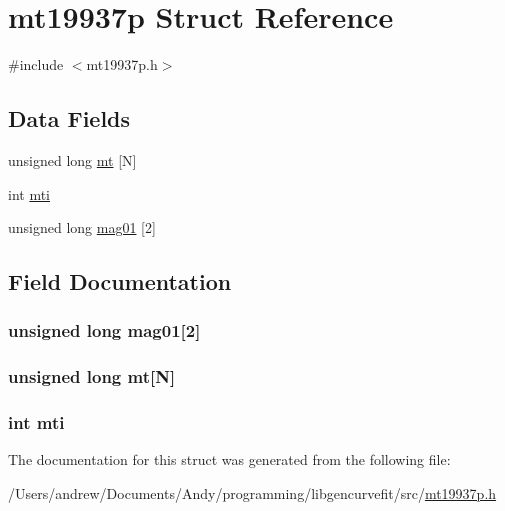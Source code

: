 \hypertarget{structmt19937p}{
\section{mt19937p Struct Reference}
\label{structmt19937p}
}


{\ttfamily \#include $<$mt19937p.h$>$}

\subsection*{Data Fields}
\begin{DoxyCompactItemize}
\item 
unsigned long \hyperlink{structmt19937p_aff3cefd0011b487c57a7af7cb3bc499f}{mt} \mbox{[}N\mbox{]}
\item 
int \hyperlink{structmt19937p_a0893639c022032e006e5b13378f7b4b2}{mti}
\item 
unsigned long \hyperlink{structmt19937p_ac9c466eceb95d637d5907eab06b468b4}{mag01} \mbox{[}2\mbox{]}
\end{DoxyCompactItemize}


\subsection{Field Documentation}
\hypertarget{structmt19937p_ac9c466eceb95d637d5907eab06b468b4}{
\subsubsection[{mag01}]{\setlength{\rightskip}{0pt plus 5cm}unsigned long {\bf mag01}\mbox{[}2\mbox{]}}}
\label{structmt19937p_ac9c466eceb95d637d5907eab06b468b4}
\hypertarget{structmt19937p_aff3cefd0011b487c57a7af7cb3bc499f}{
\subsubsection[{mt}]{\setlength{\rightskip}{0pt plus 5cm}unsigned long {\bf mt}\mbox{[}N\mbox{]}}}
\label{structmt19937p_aff3cefd0011b487c57a7af7cb3bc499f}
\hypertarget{structmt19937p_a0893639c022032e006e5b13378f7b4b2}{
\subsubsection[{mti}]{\setlength{\rightskip}{0pt plus 5cm}int {\bf mti}}}
\label{structmt19937p_a0893639c022032e006e5b13378f7b4b2}


The documentation for this struct was generated from the following file:\begin{DoxyCompactItemize}
\item 
/Users/andrew/Documents/Andy/programming/libgencurvefit/src/\hyperlink{mt19937p_8h}{mt19937p.h}\end{DoxyCompactItemize}
